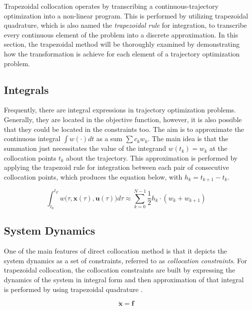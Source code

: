 \documentclass{thesisreport}
\begin{document}
 Trapezoidal collocation operates by transcribing a continuous-trajectory optimization into a non-linear program. This is performed by utilizing trapezoidal quadrature, which is also named the \textit{trapezoidal rule} for integration, to transcribe every continuous element of the problem into a discrete approximation. In this section, the trapezoidal method will be thoroughly examined by demonstrating how the transformation is achieve for each element of a trajectory optimization problem.
 
\subsection{Integrals}

Frequently, there are integral expressions in trajectory optimization problems. Generally, they are located in the objective function, however, it is also possible that they could be located in the constraints too. The aim is to approximate the continuous integral $\int w(\cdot) dt$ as a sum $\sum c_k w_k$. The main idea is that the summation just necessitates the value of the integrand  $w(t_k)=w_k$ at the collocation points $t_k$ about the trajectory. This approximation is performed by applying the trapezoid rule for integration between each pair of consecutive collocation points, which produces the equation below, with $h_k=t_{k+1} - t_k$. \cite{Betts2010}
 
 \begin{equation}
 \int_{t_0}^{t_F} w \big( \tau,\bm{x}(\tau),\bm{u}(\tau)\big)d \tau \approx \sum\limits_{k=0}^{N-1} \frac{1}{2} h_k \cdot (w_k + w_{k+1})
 \end{equation}
 
 \newpage
 
\subsection{System Dynamics}

One of the main features of direct collocation method is that it depicts the system dynamics as a set of constraints, referred to as \textit{collocation constraints}. For trapezoidal collocation, the collocation constraints are built by expressing the dynamics of the system in integral form and then approximation of that integral is performed by using trapezoidal quadrature \cite{Betts2010}. 

\begin{equation*}
\dot{\bm{x}}= \bm{f}
\end{equation*}
 
\end{document}
